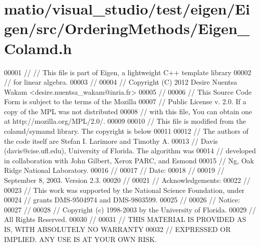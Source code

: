 \hypertarget{matio_2visual__studio_2test_2eigen_2_eigen_2src_2_ordering_methods_2_eigen___colamd_8h_source}{}\section{matio/visual\+\_\+studio/test/eigen/\+Eigen/src/\+Ordering\+Methods/\+Eigen\+\_\+\+Colamd.h}
\label{matio_2visual__studio_2test_2eigen_2_eigen_2src_2_ordering_methods_2_eigen___colamd_8h_source}

\begin{DoxyCode}
00001 \textcolor{comment}{// // This file is part of Eigen, a lightweight C++ template library}
00002 \textcolor{comment}{// for linear algebra.}
00003 \textcolor{comment}{//}
00004 \textcolor{comment}{// Copyright (C) 2012 Desire Nuentsa Wakam <desire.nuentsa\_wakam@inria.fr>}
00005 \textcolor{comment}{//}
00006 \textcolor{comment}{// This Source Code Form is subject to the terms of the Mozilla}
00007 \textcolor{comment}{// Public License v. 2.0. If a copy of the MPL was not distributed}
00008 \textcolor{comment}{// with this file, You can obtain one at http://mozilla.org/MPL/2.0/.}
00009 
00010 \textcolor{comment}{// This file is modified from the colamd/symamd library. The copyright is below}
00011 
00012 \textcolor{comment}{//   The authors of the code itself are Stefan I. Larimore and Timothy A.}
00013 \textcolor{comment}{//   Davis (davis@cise.ufl.edu), University of Florida.  The algorithm was}
00014 \textcolor{comment}{//   developed in collaboration with John Gilbert, Xerox PARC, and Esmond}
00015 \textcolor{comment}{//   Ng, Oak Ridge National Laboratory.}
00016 \textcolor{comment}{// }
00017 \textcolor{comment}{//     Date:}
00018 \textcolor{comment}{// }
00019 \textcolor{comment}{//   September 8, 2003.  Version 2.3.}
00020 \textcolor{comment}{// }
00021 \textcolor{comment}{//     Acknowledgements:}
00022 \textcolor{comment}{// }
00023 \textcolor{comment}{//   This work was supported by the National Science Foundation, under}
00024 \textcolor{comment}{//   grants DMS-9504974 and DMS-9803599.}
00025 \textcolor{comment}{// }
00026 \textcolor{comment}{//     Notice:}
00027 \textcolor{comment}{// }
00028 \textcolor{comment}{//   Copyright (c) 1998-2003 by the University of Florida.}
00029 \textcolor{comment}{//   All Rights Reserved.}
00030 \textcolor{comment}{// }
00031 \textcolor{comment}{//   THIS MATERIAL IS PROVIDED AS IS, WITH ABSOLUTELY NO WARRANTY}
00032 \textcolor{comment}{//   EXPRESSED OR IMPLIED.  ANY USE IS AT YOUR OWN RISK.}

\end{DoxyCode}
